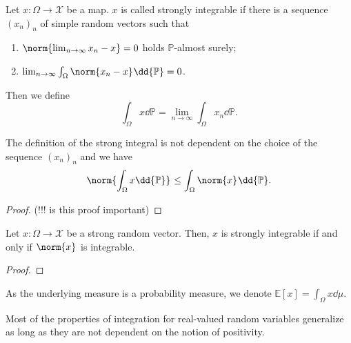 \begin{defn}
\label{strongvectorintegration}
    Let \( x: \Omega \to \mathcal{X} \) be a map. \( x \) is called strongly integrable if there is a sequence \( \left(x_n\right)_n \) of simple random vectors such that 
    \begin{enumerate}[1)]
      \item \( \norm{\lim_{n \to \infty}x_n - x }=0\) holds \( \mathbb{P} \)-almost surely;
      \item \( \lim_{n \to \infty} \int_{\Omega}^{} \norm{x_n-x}_{} \dd{\mathbb{P}}=0 \).
    \end{enumerate}
    Then we define 
    \[ \int_{\Omega}^{} x \dd{\mathbb{P}}= \lim_{n \to \infty} \int_{\Omega}^{} x_n \dd{\mathbb{P}} .\]
\end{defn}


\begin{lem}
    The definition of the strong integral is not dependent on the choice of the sequence \( \left(x_n\right)_n \) and we have 
    \[ \norm{\int_{\Omega}^{} x \dd{\mathbb{P}}}_{} \leq \int_{\Omega}^{} \norm{x}_{} \dd{\mathbb{P}}. \]
\end{lem}


\begin{proof}
  (!!! is this proof important)
\end{proof}


\begin{lem}
    Let \( x: \Omega \to \mathcal{X} \) be a strong random vector. Then, \( x \) is strongly integrable if and only if \( \norm{x}_{} \) is integrable. 
\end{lem}

\begin{proof}
    
\end{proof}

As the underlying measure is a probability measure, we denote 
\( \mathbb{E}\left[x\right] = \int_{\Omega}^{} x \dd{\mu}\).


Most of the properties of integration for real-valued random variables generalize as long as they are not dependent on the notion of positivity. 


